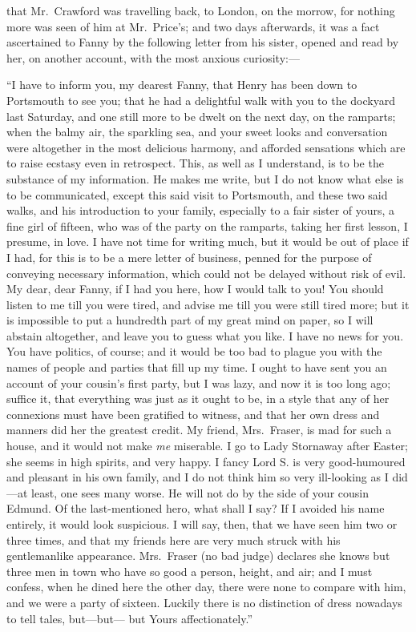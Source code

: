  that Mr.\ Crawford was travelling back,
to London, on the morrow, for nothing more was seen
of him at Mr.\ Price's; and two days afterwards, it was
a fact ascertained to Fanny by the following letter from
his sister, opened and read by her, on another account,
with the most anxious curiosity:---%

``I have to inform you, my dearest Fanny, that Henry
has been down to Portsmouth to see you; that he had a
delightful walk with you to the dockyard last Saturday,
and one still more to be dwelt on the next day,
on the ramparts; when the balmy air, the sparkling sea,
and your sweet looks and conversation were altogether
in the most delicious harmony, and afforded sensations
which are to raise ecstasy even in retrospect.  This, as well
as I understand, is to be the substance of my information.
He makes me write, but I do not know what else is to
be communicated, except this said visit to Portsmouth,
and these two said walks, and his introduction to
your family, especially to a fair sister of yours, a fine
girl of fifteen, who was of the party on the ramparts,
taking her first lesson, I presume, in love.  I have
not time for writing much, but it would be out of place
if I had, for this is to be a mere letter of business,
penned for the purpose of conveying necessary information,
which could not be delayed without risk of evil.  My dear,
dear Fanny, if I had you here, how I would talk to you!
You should listen to me till you were tired, and advise
me till you were still tired more; but it is impossible
to put a hundredth part of my great mind on paper,
so I will abstain altogether, and leave you to guess what
you like.  I have no news for you.  You have politics,
of course; and it would be too bad to plague you with
the names of people and parties that fill up my time.
I ought to have sent you an account of your cousin's
first party, but I was lazy, and now it is too long ago;
suffice it, that everything was just as it ought to be,
in a style that any of her connexions must have been
gratified to witness, and that her own dress and manners did
her the greatest credit.  My friend, Mrs.\ Fraser, is mad
for such a house, and it would not make \emph{me} miserable.
I go to Lady Stornaway after Easter; she seems in high spirits,
and very happy.  I fancy Lord S. is very good-humoured
and pleasant in his own family, and I do not think him so
very ill-looking as I did---at least, one sees many worse.
He will not do by the side of your cousin Edmund.
Of the last-mentioned hero, what shall I say?  If I
avoided his name entirely, it would look suspicious.
I will say, then, that we have seen him two or three times,
and that my friends here are very much struck with his
gentlemanlike appearance.  Mrs.\ Fraser (no bad judge)
declares she knows but three men in town who have so good
a person, height, and air; and I must confess, when he dined
here the other day, there were none to compare with him,
and we were a party of sixteen.  Luckily there is no
distinction of dress nowadays to tell tales, but---but---%
but Yours affectionately.''

